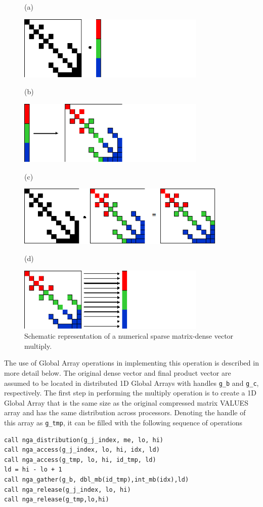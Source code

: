 %
\begin{figure}
(a)

\includegraphics[width=9cm]{sparse-a}

(b)

\includegraphics[width=9cm]{sparse-b}

(c)

\includegraphics[width=10cm]{sparse-c}

(d)

\includegraphics[width=9cm]{sparse-d}

\caption{\label{cap:SparseMatrix}Schematic representation of a numerical sparse
matrix-dense vector multiply.}

\end{figure}


The use of Global Array operations in implementing this operation
is described in more detail below. The original dense vector and final
product vector are assumed to be located in distributed 1D Global
Arrays with handles \texttt{g\_b} and \texttt{g\_c}, respectively.
The first step in performing the multiply operation is to create a
1D Global Array that is the same size as the original compressed matrix
VALUES array and has the same distribution across processors. Denoting
the handle of this array as \texttt{g\_tmp}, it can be filled with
the following sequence of operations
\begin{lstlisting}[style=cppnoframe]
call nga_distribution(g_j_index, me, lo, hi)
call nga_access(g_j_index, lo, hi, idx, ld)
call nga_access(g_tmp, lo, hi, id_tmp, ld)
ld = hi - lo + 1
call nga_gather(g_b, dbl_mb(id_tmp),int_mb(idx),ld)
call nga_release(g_j_index, lo, hi)
call nga_release(g_tmp,lo,hi)
\end{lstlisting}

